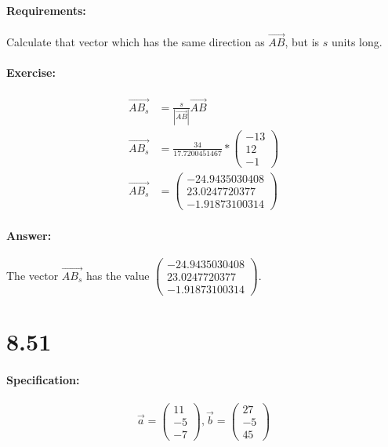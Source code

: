 \documentclass{article}
\begin{document}
\paragraph{Requirements:}
Calculate that vector which has the same direction as $\vec{AB}$, but is $s$ units long.

\paragraph{Exercise:}

\begin{align}
    \vec{AB_s} &= \frac{s}{|\vec{AB}|}\vec{AB} \\
    \vec{AB_s} &= \frac{34}{17.7200451467} * \begin{pmatrix}
        -13 \\ 
        12 \\
        -1
    \end{pmatrix} \\
    \vec{AB_s} &= \begin{pmatrix}
        -24.9435030408 \\
        23.0247720377 \\
        -1.91873100314
    \end{pmatrix}
\end{align}

\paragraph{Answer:}
The vector $\vec{AB_s}$ has the value $\begin{pmatrix}
        -24.9435030408 \\
        23.0247720377 \\
        -1.91873100314
    \end{pmatrix}$.

\pagebreak

\section{8.51}

\paragraph{Specification:}

\begin{equation}
    \vec{a} = \begin{pmatrix}
        11 \\
        -5 \\ 
        -7
    \end{pmatrix},
    \vec{b} = \begin{pmatrix}
        27 \\
        -5 \\
        45
    \end{pmatrix}
\end{equation}
\end{document}
